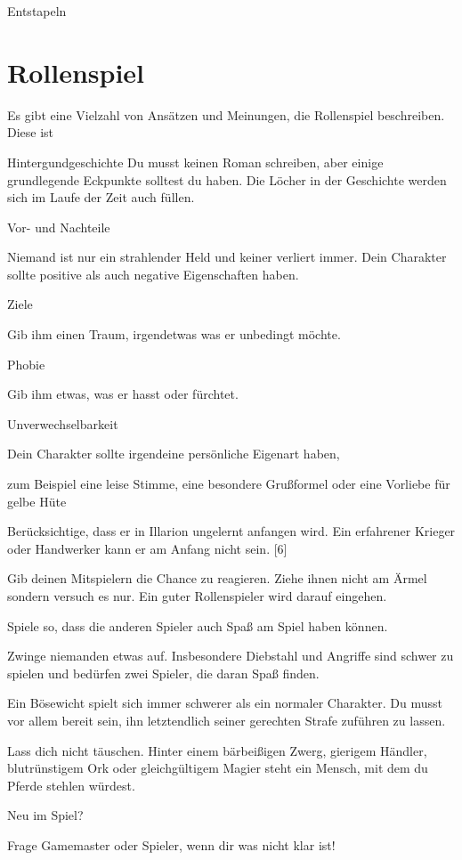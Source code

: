 \documentclass[a4paper,11pt]{book}
\begin{document}
Entstapeln

\chapter{Rollenspiel}

Es gibt eine Vielzahl von Ansätzen und Meinungen, die Rollenspiel beschreiben. Diese ist

Hintergundgeschichte  Du musst keinen Roman schreiben, aber einige grundlegende Eckpunkte solltest du haben. Die Löcher in der Geschichte werden sich im Laufe der Zeit auch füllen.

Vor- und Nachteile

Niemand ist nur ein strahlender Held und keiner verliert immer. Dein Charakter sollte positive als auch negative Eigenschaften haben.

Ziele

Gib ihm einen Traum, irgendetwas was er unbedingt möchte.

Phobie

Gib ihm etwas, was er hasst oder fürchtet.

Unverwechselbarkeit

Dein Charakter sollte irgendeine persönliche Eigenart haben,

zum Beispiel eine leise Stimme, eine besondere Grußformel oder eine Vorliebe für gelbe Hüte

Berücksichtige, dass er in Illarion ungelernt anfangen wird. Ein erfahrener Krieger oder Handwerker kann er am Anfang nicht sein. [6]

Gib deinen Mitspielern die Chance zu reagieren. Ziehe ihnen nicht am Ärmel sondern versuch es nur. Ein guter Rollenspieler wird darauf eingehen.

Spiele so, dass die anderen Spieler auch Spaß am Spiel haben können.

Zwinge niemanden etwas auf. Insbesondere Diebstahl und Angriffe sind schwer zu spielen und bedürfen zwei Spieler, die daran Spaß finden.

Ein Bösewicht spielt sich immer schwerer als ein normaler Charakter. Du musst vor allem bereit sein, ihn letztendlich seiner gerechten Strafe zuführen zu lassen.

Lass dich nicht täuschen. Hinter einem bärbeißigen Zwerg, gierigem Händler, blutrünstigem Ork oder gleichgültigem Magier steht ein Mensch, mit dem du Pferde stehlen würdest.

Neu im Spiel?

Frage Gamemaster oder Spieler, wenn dir was nicht klar ist!
\end{document}

